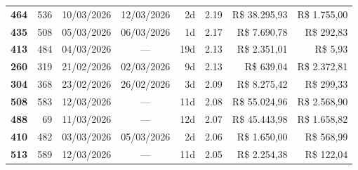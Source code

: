 \documentclass[a4paper,10pt]{article}
\begin{document}
\begin{center}
\begin{longtable}{>{\scriptsize}r>{\scriptsize}r>{\scriptsize}c>{\scriptsize}c>{\scriptsize}r>{\scriptsize}r>{\scriptsize}r>{\scriptsize}r}
\textcolor{anomyellow}{\textbf{464}} & 536 & 10/03/2026 & 12/03/2026 & 2d & \textcolor{anomyellow}{2.19} & R\$ 38.295,93 & \textcolor{anomred}{R\$ 1.755,00} \\

\textcolor{anomyellow}{\textbf{435}} & 508 & 05/03/2026 & 06/03/2026 & 1d & \textcolor{anomyellow}{2.17} & R\$ 7.690,78 & \textcolor{anomred}{R\$ 292,83} \\

\textcolor{anomyellow}{\textbf{413}} & 484 & 04/03/2026 & — & 19d & \textcolor{anomyellow}{2.13} & R\$ 2.351,01 & \textcolor{anomred}{R\$ 5,93} \\

\textcolor{anomyellow}{\textbf{260}} & 319 & 21/02/2026 & 02/03/2026 & 9d & \textcolor{anomyellow}{2.13} & R\$ 639,04 & \textcolor{anomred}{R\$ 2.372,81} \\

\textcolor{anomyellow}{\textbf{304}} & 368 & 23/02/2026 & 26/02/2026 & 3d & \textcolor{anomyellow}{2.09} & R\$ 8.275,42 & \textcolor{anomred}{R\$ 299,33} \\

\textcolor{anomyellow}{\textbf{508}} & 583 & 12/03/2026 & — & 11d & \textcolor{anomyellow}{2.08} & R\$ 55.024,96 & \textcolor{anomred}{R\$ 2.568,90} \\

\textcolor{anomyellow}{\textbf{488}} & 69 & 11/03/2026 & — & 12d & \textcolor{anomyellow}{2.07} & R\$ 45.443,98 & \textcolor{anomred}{R\$ 1.658,82} \\

\textcolor{anomyellow}{\textbf{410}} & 482 & 03/03/2026 & 05/03/2026 & 2d & \textcolor{anomyellow}{2.06} & R\$ 1.650,00 & \textcolor{anomred}{R\$ 568,99} \\

\textcolor{anomyellow}{\textbf{513}} & 589 & 12/03/2026 & — & 11d & \textcolor{anomyellow}{2.05} & R\$ 2.254,38 & \textcolor{anomred}{R\$ 122,04} \\

\end{longtable}\end{center}
\end{document}
